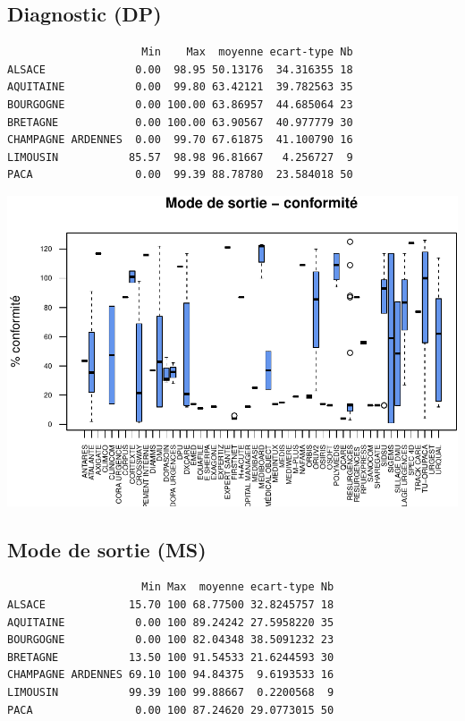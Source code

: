 \documentclass[]{article}
\begin{document}
\subsection{Diagnostic (DP)}\label{diagnostic-dp-1}

\begin{verbatim}
                     Min    Max  moyenne ecart-type Nb
ALSACE              0.00  98.95 50.13176  34.316355 18
AQUITAINE           0.00  99.80 63.42121  39.782563 35
BOURGOGNE           0.00 100.00 63.86957  44.685064 23
BRETAGNE            0.00 100.00 63.90567  40.977779 30
CHAMPAGNE ARDENNES  0.00  99.70 67.61875  41.100790 16
LIMOUSIN           85.57  98.98 96.81667   4.256727  9
PACA                0.00  99.39 88.78780  23.584018 50
\end{verbatim}

\includegraphics{septembre2015_files/figure-latex/unnamed-chunk-25-1.pdf}

\subsection{Mode de sortie (MS)}\label{mode-de-sortie-ms-1}

\begin{verbatim}
                     Min Max  moyenne ecart-type Nb
ALSACE             15.70 100 68.77500 32.8245757 18
AQUITAINE           0.00 100 89.24242 27.5958220 35
BOURGOGNE           0.00 100 82.04348 38.5091232 23
BRETAGNE           13.50 100 91.54533 21.6244593 30
CHAMPAGNE ARDENNES 69.10 100 94.84375  9.6193533 16
LIMOUSIN           99.39 100 99.88667  0.2200568  9
PACA                0.00 100 87.24620 29.0773015 50
\end{verbatim}
\end{document}
